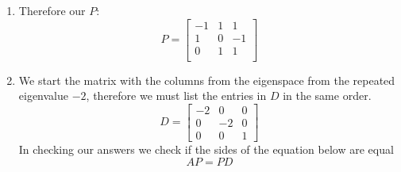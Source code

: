 \documentclass[12pt letter]{report}
\begin{document}
{{\begin{enumerate}
\begin{align*}
              \\
              \mbold{x} = \begin{bmatrix} x_3 \\ -x_3 \\ x_3 \end{bmatrix} = x_3 \begin{bmatrix} 1 \\ -1 \\ 1 \end{bmatrix}
            \end{align*}
            Our linearly dependent eigenvectors are therefore
            \[
              \{ \begin{bmatrix} -1 \\ 1 \\ 0  \end{bmatrix}, \begin{bmatrix} -1 \\ 0 \\ 1 \end{bmatrix}, \begin{bmatrix} 1 \\ -1
                \\ 1\end{bmatrix}     \}
            \]
      \item
            Therefore our $P$:
            \[
              P = \begin{bmatrix}
                -1 & 1 & 1  \\
                1  & 0 & -1 \\
                0  & 1 & 1  \\
              \end{bmatrix}
            \]
      \item
            We start the matrix with the columns from the eigenspace from the repeated eigenvalue $-2$, therefore we must list the entries in
            $D$ in the same order.
            \[
              D = \begin{bmatrix}
                -2 & 0  & 0 \\
                0  & -2 & 0 \\
                0  & 0  & 1
              \end{bmatrix}
            \]
            In checking our answers we check if the sides of the equation below are equal
            \[
              AP = PD
            \]
    \end{enumerate}
  }
}


\end{document}
